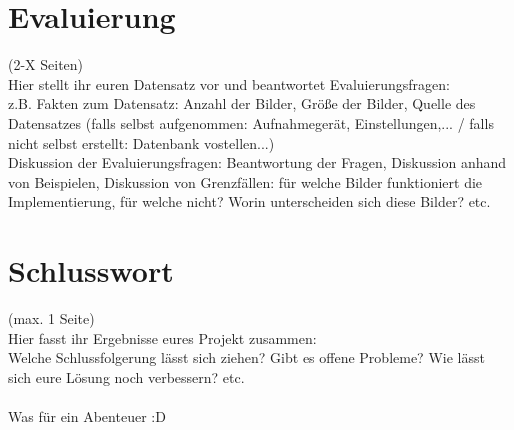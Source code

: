 \documentclass[deutsch]{scrartcl}
\begin{document}
\newpage
\section{Evaluierung}
(2-X Seiten)\\
Hier stellt ihr euren Datensatz vor und beantwortet Evaluierungsfragen:\\
z.B. Fakten zum Datensatz: Anzahl der Bilder, Größe der Bilder, Quelle des Datensatzes (falls selbst aufgenommen: Aufnahmegerät, Einstellungen,... / falls nicht selbst erstellt: Datenbank vostellen...)\\
Diskussion der Evaluierungsfragen: Beantwortung der Fragen, Diskussion anhand von Beispielen, Diskussion von Grenzfällen: für welche Bilder funktioniert die Implementierung, für welche nicht? Worin unterscheiden sich diese Bilder? etc.

\newpage
\section{Schlusswort}
(max. 1 Seite)\\
Hier fasst ihr Ergebnisse eures Projekt zusammen:\\
Welche Schlussfolgerung lässt sich ziehen? Gibt es offene Probleme? Wie lässt sich eure Lösung noch verbessern? etc.\\\\
Was für ein Abenteuer :D

\newpage


\end{document}
